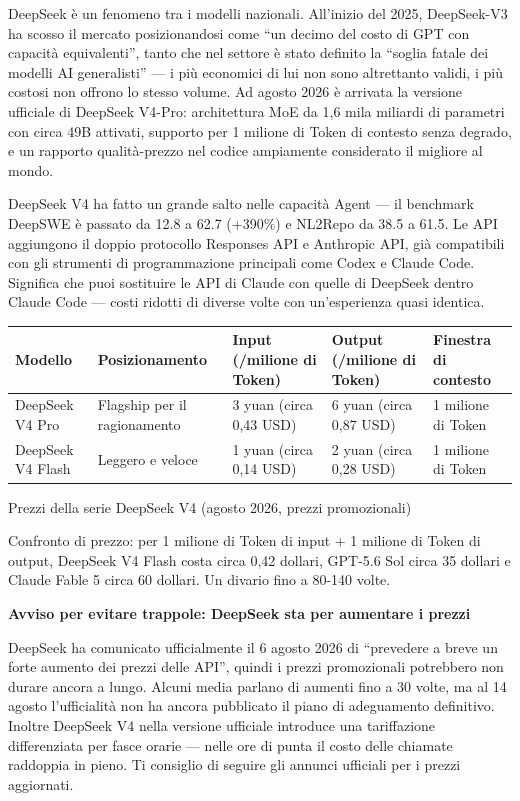 DeepSeek è un fenomeno tra i modelli nazionali. All'inizio del 2025, DeepSeek-V3 ha scosso il mercato posizionandosi come “un decimo del costo di GPT con capacità equivalenti”, tanto che nel settore è stato definito la “soglia fatale dei modelli AI generalisti” — i più economici di lui non sono altrettanto validi, i più costosi non offrono lo stesso volume. Ad agosto 2026 è arrivata la versione ufficiale di DeepSeek V4-Pro: architettura MoE da 1,6 mila miliardi di parametri con circa 49B attivati, supporto per 1 milione di Token di contesto senza degrado, e un rapporto qualità-prezzo nel codice ampiamente considerato il migliore al mondo.

DeepSeek V4 ha fatto un grande salto nelle capacità Agent — il benchmark DeepSWE è passato da 12.8 a 62.7 (+390\%) e NL2Repo da 38.5 a 61.5. Le API aggiungono il doppio protocollo Responses API e Anthropic API, già compatibili con gli strumenti di programmazione principali come Codex e Claude Code. Significa che puoi sostituire le API di Claude con quelle di DeepSeek dentro Claude Code — costi ridotti di diverse volte con un'esperienza quasi identica.

\begin{center}
\begin{tabularx}{\linewidth}{|X|X|X|X|X|}
\hline
\textbf{Modello} & \textbf{Posizionamento} & \textbf{Input (/milione di Token)} & \textbf{Output (/milione di Token)} & \textbf{Finestra di contesto} \tabularnewline
\hline
DeepSeek V4 Pro & Flagship per il ragionamento & 3 yuan (circa 0,43 USD) & 6 yuan (circa 0,87 USD) & 1 milione di Token \tabularnewline
DeepSeek V4 Flash & Leggero e veloce & 1 yuan (circa 0,14 USD) & 2 yuan (circa 0,28 USD) & 1 milione di Token \tabularnewline
\hline
\end{tabularx}
\end{center}

\begin{center}\small\color{gray}Prezzi della serie DeepSeek V4 (agosto 2026, prezzi promozionali)\end{center}

Confronto di prezzo: per 1 milione di Token di input + 1 milione di Token di output, DeepSeek V4 Flash costa circa 0,42 dollari, GPT-5.6 Sol circa 35 dollari e Claude Fable 5 circa 60 dollari. Un divario fino a 80-140 volte.

\textbf{Avviso per evitare trappole: DeepSeek sta per aumentare i prezzi}\par

DeepSeek ha comunicato ufficialmente il 6 agosto 2026 di “prevedere a breve un forte aumento dei prezzi delle API”, quindi i prezzi promozionali potrebbero non durare ancora a lungo. Alcuni media parlano di aumenti fino a 30 volte, ma al 14 agosto l'ufficialità non ha ancora pubblicato il piano di adeguamento definitivo. Inoltre DeepSeek V4 nella versione ufficiale introduce una tariffazione differenziata per fasce orarie — nelle ore di punta il costo delle chiamate raddoppia in pieno. Ti consiglio di seguire gli annunci ufficiali per i prezzi aggiornati.

